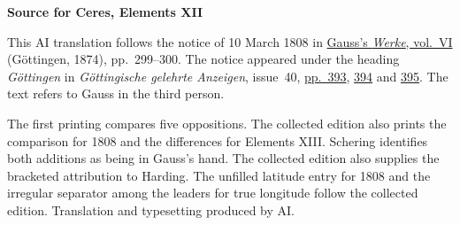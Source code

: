 \clearpage\thispagestyle{empty}
\begin{center}\textbf{Source for Ceres, Elements XII}\end{center}
\noindent This AI translation follows the notice of 10 March 1808 in \href{https://gdz.sub.uni-goettingen.de/id/PPN236007467}{Gauss’s \textit{Werke}, vol.~VI} (Göttingen, 1874), pp.~299--300. The notice appeared under the heading \textit{Göttingen} in \textit{Göttingische gelehrte Anzeigen}, issue~40, \href{https://manifests.sub.uni-goettingen.de/iiif/image/gdz:PPN319721507_1808:00000397/full/1600,/0/default.jpg}{pp.~393}, \href{https://manifests.sub.uni-goettingen.de/iiif/image/gdz:PPN319721507_1808:00000398/full/1600,/0/default.jpg}{394} and \href{https://manifests.sub.uni-goettingen.de/iiif/image/gdz:PPN319721507_1808:00000399/full/1600,/0/default.jpg}{395}. The text refers to Gauss in the third person.
\par\medskip
The first printing compares five oppositions. The collected edition also prints the comparison for 1808 and the differences for Elements XIII. Schering identifies both additions as being in Gauss’s hand. The collected edition also supplies the bracketed attribution to Harding. The unfilled latitude entry for 1808 and the irregular separator among the leaders for true longitude follow the collected edition. Translation and typesetting produced by AI.
\clearpage
